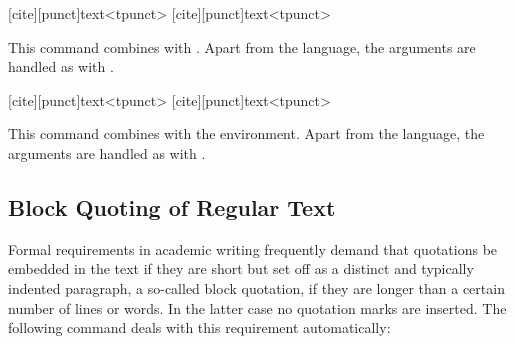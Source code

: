 \documentclass{ltxdockit}[2010/09/26]
\begin{document}
\begin{ltxsyntax}

[cite][punct]{text}<tpunct>
[cite][punct]{text}<tpunct>

This command combines  with . Apart from the language, the arguments are handled as with .

[cite][punct]{text}<tpunct>
[cite][punct]{text}<tpunct>

This command combines  with the  environment. Apart from the language, the arguments are handled as with .

\end{ltxsyntax}

\subsection{Block Quoting of Regular Text}
\label{bas:blk:reg}

Formal requirements in academic writing frequently demand that quotations be embedded in the text if they are short but set off as a distinct and typically indented paragraph, a so-called block quotation, if they are longer than a certain number of lines or words. In the latter case no quotation marks are inserted. The following command deals with this requirement automatically:
\end{document}
